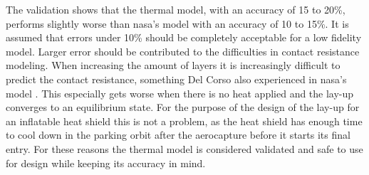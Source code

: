 The validation shows that the thermal model, with an accuracy of 15 to 20\%, performs slightly worse than \gls{nasa}'s model with an accuracy of 10 to 15\%. It is assumed that errors under 10\% should be completely acceptable for a low fidelity model. Larger error should be contributed to the difficulties in contact resistance modeling. When increasing the amount of layers it is increasingly difficult to predict the contact resistance, something Del Corso also experienced in \gls{nasa}'s model \cite{Corso2009}. This especially gets worse when there is no heat applied and the lay-up converges to an equilibrium state. For the purpose of the design of the lay-up for an inflatable heat shield this is not a problem, as the heat shield has enough time to cool down in the parking orbit after the aerocapture before it starts its final entry. For these reasons the thermal model is considered validated and safe to use for design while keeping its accuracy in mind.